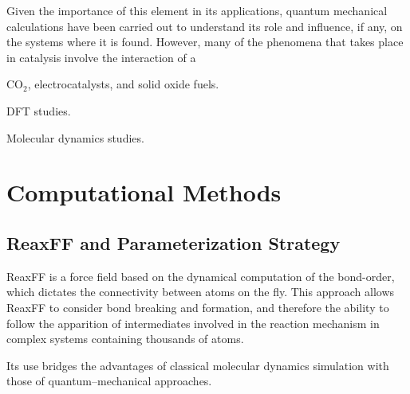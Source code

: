\documentclass[journal=jpcafh,manuscript=article]{achemso}
\begin{document}
Given the importance of this element in its applications, quantum mechanical calculations have been carried out to understand its role and influence, if any, on the systems where it is found.
However, many of the phenomena that takes place in catalysis involve the interaction of a 

CO$_2$, electrocatalysts, and solid oxide fuels.\cite{
habisreutinger_photocatalytic_2013,
e.benson_electrocatalytic_2009,
pradeepindrakanti_photoinduced_2009,
indrakanti_quantum_2009,
zeng_review_2018,
yamada_systematic_2018,
kar_enhanced_2016,
grimaud_double_2013,
ni_electrochemical_2012,
tan_co_2011,
baniecki_photoemission_2008,
jia_heterogeneous_2017,
yin_oxide_2018,
zheng_review_2017,
andersson_review_2010,
beatriz_microwave-assisted_2015}

DFT studies.\cite{tian_dft_2018,
mayeshiba_strain_2017,
wang_oxidation_2006,
li_density_2013,
liu_influence_2018,
seo_design_2015,
evarestov_adsorption_2007,
pilania_establishing_2012,
pilania_adsorption_2010,
zurek_predicting_2015}

Molecular dynamics studies.\cite{wang_coarse-grained_2014}

\section{Computational Methods}

\subsection{ReaxFF and Parameterization Strategy}

ReaxFF is a force field based on the dynamical computation of the bond-order, which dictates the connectivity between atoms on the fly.
This approach allows ReaxFF to consider bond breaking and formation, and therefore the ability to follow the apparition of intermediates involved in the reaction mechanism in complex systems containing thousands of atoms.\cite{migliorati_development_2017,merinov_reaxff_2014,
raymand_reactive_2008,
shin_development_2015,
van_duin_reaxff_2008,
goddard_development_2006,
hubin_parameterization_2016,
senftle_reaxff_2016,
chenoweth_reaxff_2009,
chenoweth_reaxff_2008,
van_duin_reaxff_2008-1,
liu_reaxff-lg:_2011}

Its use bridges the advantages of classical molecular dynamics simulation with those of quantum--mechanical approaches.
\end{document}
